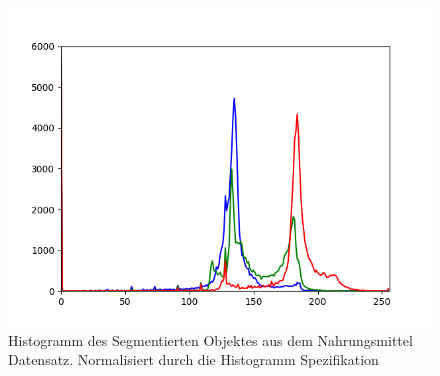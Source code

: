 \documentclass[a4paper,12pt,oneside]{article}
\begin{document}
\begin{figure}[htb]
\begin{minipage}[c]{0.08\textwidth}
\end{minipage}
\hfill
\begin{minipage}[c]{0.3\textwidth}
\includegraphics[width=\textwidth]{Sources/Bild3_HS_histo.png}
\end{minipage}
\caption{Histogramm des Segmentierten Objektes aus dem Nahrungsmittel Datensatz. Normalisiert durch die Histogramm Spezifikation}
\label{img:evalHS}
\end{figure}
\end{document}
